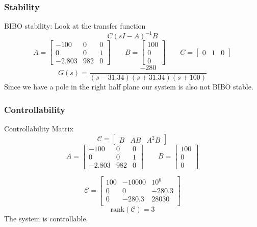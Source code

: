 \documentclass{beamer}
\begin{document}
\begin{frame}
\frametitle{Stability}
BIBO stability: Look at the transfer function
$$
C ( sI-A ) ^{-1} B
$$
$$
A =
\begin{bmatrix}
-100 & 0 & 0 \\
0 & 0 & 1 \\
-2.803 & 982 & 0
\end{bmatrix}
\qquad B = \begin{bmatrix} 100 \\ 0 \\ 0\end{bmatrix}
\qquad C = \begin{bmatrix} 0 & 1 & 0 \end{bmatrix}
$$
$$ G(s) = \frac{-280}{(s-31.34) (s+31.34) (s+100)} $$
Since we have a pole in the right half plane our system is also not BIBO stable.

\end{frame}

\begin{frame}
\frametitle{Open Loop}
\begin{figure}
\centering
\texttt{[image: \{images/OpenLoop\_No input]}.png}
\end{figure}
\end{frame}

\begin{frame}
\frametitle{Controllability}
Controllability Matrix
$$ \mathcal{C} = \begin{bmatrix} B & AB & A^2B \end{bmatrix} $$
$$
A =
\begin{bmatrix}
-100 & 0 & 0 \\
0 & 0 & 1 \\
-2.803 & 982 & 0
\end{bmatrix}
\qquad B = \begin{bmatrix} 100 \\ 0 \\ 0\end{bmatrix}
$$

$$
\mathcal{C} =
\begin{bmatrix}
100 & -10000 & 10^6 \\
0 & 0 & -280.3 \\
0 & -280.3 & 28030 \\
\end{bmatrix}
$$
$$ \text{rank}(\mathcal{C}) = 3 $$
The system is controllable.
\end{frame}
\end{document}
